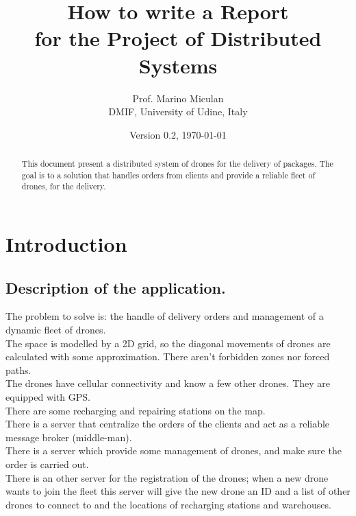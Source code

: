 \documentclass[a4paper, oneside]{memoir}
\title{How to write a Report\\ for the Project of Distributed Systems}
\author{Prof. Marino Miculan\\ DMIF, University of Udine, Italy}
\date{Version 0.2, \today}
\begin{document}
\maketitle
\begin{abstract}
This document present a distributed system of drones for the delivery of packages. The goal is to a solution that handles orders from clients and provide a reliable fleet of drones, for the delivery.
\end{abstract}

\chapter{Introduction}\label{ch:intro}


\section{Description of the application.}
The problem to solve is: the handle of delivery orders and management of a dynamic fleet of drones.\\
The space is modelled by a 2D grid, so the diagonal movements of drones are calculated with some approximation. There aren't forbidden zones nor forced paths.\\
The drones have cellular connectivity and know a few other drones. They are equipped with GPS.\\
There are some recharging and repairing stations on the map.\\
There is a server that centralize the orders of the clients and act as a reliable message broker (middle-man).\\
There is a server which provide some management of drones, and make sure the order is carried out.\\
There is an other server for the registration of the drones; when a new drone wants to join the fleet this server will give the new drone an ID and a list of other drones to connect to and the locations of recharging stations and warehouses.
\end{document}
